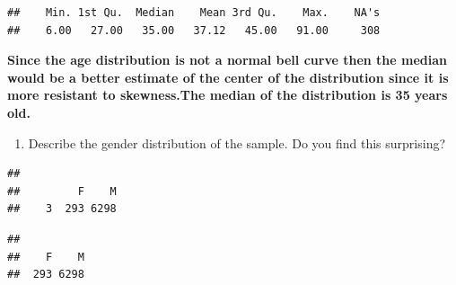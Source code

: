 \documentclass[
]{article}
\newenvironment{Shaded}{\begin{snugshade}}{\end{snugshade}}
\newcommand{\ConstantTok}[1]{\textcolor[rgb]{0.00,0.00,0.00}{#1}}
\newcommand{\FunctionTok}[1]{\textcolor[rgb]{0.00,0.00,0.00}{#1}}
\newcommand{\NormalTok}[1]{#1}
\newcommand{\OtherTok}[1]{\textcolor[rgb]{0.56,0.35,0.01}{#1}}
\newcommand{\SpecialCharTok}[1]{\textcolor[rgb]{0.00,0.00,0.00}{#1}}
\newcommand{\StringTok}[1]{\textcolor[rgb]{0.31,0.60,0.02}{#1}}
\providecommand{\tightlist}{%
  \setlength{\itemsep}{0pt}\setlength{\parskip}{0pt}}
\begin{document}
\begin{verbatim}
##    Min. 1st Qu.  Median    Mean 3rd Qu.    Max.    NA's 
##    6.00   27.00   35.00   37.12   45.00   91.00     308
\end{verbatim}

\textbf{Since the age distribution is not a normal bell curve then the
median would be a better estimate of the center of the distribution
since it is more resistant to skewness.The median of the distribution is
35 years old.}

\begin{enumerate}
\def\labelenumi{\alph{enumi}.}
\setcounter{enumi}{2}
\tightlist
\item
  Describe the gender distribution of the sample. Do you find this
  surprising?
\end{enumerate}

\begin{Shaded}
\end{Shaded}

\begin{verbatim}
## 
##         F    M 
##    3  293 6298
\end{verbatim}

\begin{Shaded}
\end{Shaded}

\begin{verbatim}
## 
##    F    M 
##  293 6298
\end{verbatim}

\begin{Shaded}
\end{Shaded}
\end{document}
